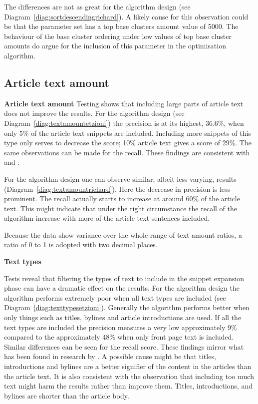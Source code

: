 The differences are not as great for the \citeauthor{Moe2014compact} algorithm design (see Diagram~\ref{diag:sortdescendingrichard}). A likely cause for this observation could be that the \citeauthor{Moe2014compact} parameter set has a top base clusters amount value of 5000. The behaviour of the base cluster ordering under low values of top base cluster amounts do argue for the inclusion of this parameter in the optimisation algorithm.

\subsection{Article text amount}

\textbf{Article text amount}
Testing shows that including large parts of article text does not improve the results. For the \citeauthor{Oren1998} algorithm design (see Diagram~\ref{diag:textamountetzioni}) the precision is at its highest, 36.6\%, when only 5\% of the article text snippets are included. Including more snippets of this type only serves to decrease the score; 10\% article text gives a score of 29\%. The same observations can be made for the recall. These findings are consistent with \cite{Oren1998} and \cite{Moe2014compact}.

For the \citeauthor{Moe2014compact} algorithm design one can observe similar, albeit less varying, results (Diagram~\ref{diag:textamountrichard}). Here the decrease in precision is less prominent. The recall actually starts to increase at around 60\% of the article text. This might indicate that under the right circumstance the recall of the algorithm increase with more of the article text sentences included.

Because the data show variance over the whole range of text amount ratios, a ratio of 0 to 1 is adopted with two decimal places.

\textbf{Text types}

Tests reveal that filtering the types of text to include in the snippet expansion phase can have a dramatic effect on the results. For the \citeauthor{Oren1998} algorithm design the \CTC algorithm performs extremely poor when all text types are included (see Diagram~\ref{diag:texttypesetzioni}). Generally the algorithm performs better when only things such as titles, bylines and article introductions are used. If all the text types are included the precision measures a very low approximately  9\% compared to the approximately  48\% when only front page text is included. Similar differences can be seen for the recall score. These findings mirror what has been found in research by \cite{Oren1998}. A possible cause might be that titles, introductions and bylines are a better signifier of the content in the articles than the article text. It is also consistent with the observation that including too much text might harm the results rather than improve them. Titles, introductions, and bylines are shorter than the article body.

